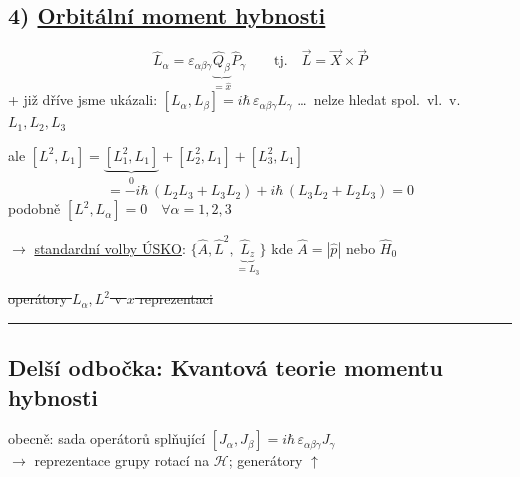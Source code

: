 \subsection*{4) \underline{Orbitální moment hybnosti} \ }
\[
  \hat L_\alpha = \varepsilon_{\alpha\beta\gamma}\underbrace{\hat Q_\beta}_{=\hat x}\hat P_\gamma
  \qquad\text{tj.}\quad \vec L = \vec X\times\vec P
\]
+ již dříve jsme ukázali: \quad $[L_\alpha,L_\beta] = i\hbar\,\varepsilon_{\alpha\beta\gamma}L_\gamma$ \quad \dots\ nelze hledat spol.\ vl.\ v.\ $L_1,L_2,L_3$

ale \quad $[L^2,L_1] = \underbrace{[L_1^2,L_1]}_{0} + [L_2^2,L_1] + [L_3^2,L_1]$
\[
  = -i\hbar\,(L_2L_3 + L_3L_2) + i\hbar\,(L_3L_2 + L_2L_3) = 0
\]
podobně \quad $[L^2,L_\alpha] = 0 \quad \forall\alpha = 1,2,3$

$\to$ \underline{standardní volby ÚSKO}: \quad $\{\hat A,\hat L^2,\underbrace{\hat L_z}_{=L_3}\}$ \quad kde $\hat A = |\hat p|$ nebo $\hat H_0$

\sout{operátory $L_\alpha, L^2$ v $x$ reprezentaci}

{\color{prbarva}\rule{\linewidth}{0.8pt}}
\subsection{Delší odbočka: Kvantová teorie momentu hybnosti}

obecně: sada operátorů splňující \quad $[J_\alpha,J_\beta] = i\hbar\,\varepsilon_{\alpha\beta\gamma}J_\gamma$ \\
\quad $\to$ reprezentace grupy rotací na $\mathcal{H}$; generátory $\uparrow$

